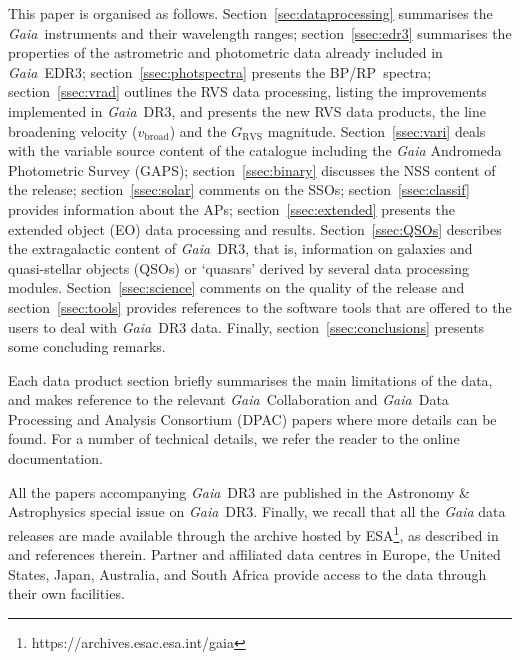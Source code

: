 \documentclass[longauth]{aa}
\providecommand{\vbroad}{\ensuremath{v_\mathrm{broad}}\xspace}
\providecommand{\bprp}{BP/RP\xspace}
\providecommand\grvs{\ensuremath{G_\mathrm{RVS}}\xspace}
\newcommand\gaia{\textit{Gaia}\xspace}
\providecommand\gedrthree{\textit{Gaia}~EDR3\xspace}
\providecommand\gdrthree{\textit{Gaia}~DR3\xspace}
\providecommand{\red}[1]{\textcolor{red}{#1}}
\begin{document}
This paper is organised as follows. Section~\ref{sec:dataprocessing} summarises the \gaia\ instruments and their wavelength ranges; section~\ref{ssec:edr3} summarises the properties of the astrometric and photometric data already included in \gedrthree; section~\ref{ssec:photspectra} presents the \bprp\ spectra; section~\ref{ssec:vrad} outlines the RVS data processing, listing the improvements implemented in \gdrthree, and presents the new RVS data products, the line broadening velocity (\vbroad) and the \grvs magnitude. Section~\ref{ssec:vari} deals with the variable source content of the catalogue including the \gaia Andromeda Photometric Survey (GAPS); section~\ref{ssec:binary} discusses the NSS content of the release; section~\ref{ssec:solar} comments on the SSOs; section~\ref{ssec:classif} provides information about the APs; section~\ref{ssec:extended} presents the extended object (EO) data processing and results. Section~\ref{ssec:QSOs} describes the extragalactic content of \gdrthree, that is, information on galaxies and  quasi-stellar objects (QSOs) or `quasars' derived by several data processing modules. Section~\ref{ssec:science} comments on the quality of the release and section~\ref{ssec:tools} provides references to the software tools that are offered to the users to deal with \gdrthree data. Finally, section~\ref{ssec:conclusions} presents some concluding remarks.

Each data product section briefly summarises the main limitations of the data, and makes reference to the relevant \gaia\ Collaboration and \gaia\ Data Processing and Analysis Consortium (DPAC) papers where more details can be found. For a number of technical details, we refer the reader to the online documentation. %

All the papers accompanying \gdrthree are published in the Astronomy \& Astrophysics special issue on \gdrthree. Finally, we recall that all the {\gaia} data releases are made  available through the archive hosted by ESA\footnote{https://archives.esac.esa.int/gaia}, as described in \citet{EDR3-DPACP-130} and references therein. Partner and affiliated data centres in Europe, the United States, Japan, Australia, and South Africa  provide access to the data through their own facilities. 

  
\end{document}
